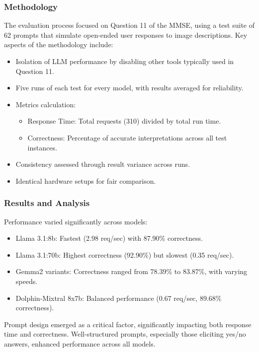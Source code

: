 \subsubsection{Methodology}
The evaluation process focused on Question 11 of the MMSE, using a test suite of 62 prompts that simulate open-ended user responses to image descriptions. Key aspects of the methodology include:

\begin{itemize}
    \item Isolation of LLM performance by disabling other tools typically used in Question 11.
    \item Five runs of each test for every model, with results averaged for reliability.
    \item Metrics calculation: 
        \begin{itemize}
            \item Response Time: Total requests (310) divided by total run time.
            \item Correctness: Percentage of accurate interpretations across all test instances.
        \end{itemize}
    \item Consistency assessed through result variance across runs.
    \item Identical hardware setups for fair comparison.
\end{itemize}

\subsubsection{Results and Analysis}
Performance varied significantly across models:

\begin{itemize}
    \item Llama 3.1:8b: Fastest (2.98 req/sec) with 87.90\% correctness.
    \item Llama 3.1:70b: Highest correctness (92.90\%) but slowest (0.35 req/sec).
    \item Gemma2 variants: Correctness ranged from 78.39\% to 83.87\%, with varying speeds.
    \item Dolphin-Mixtral 8x7b: Balanced performance (0.67 req/sec, 89.68\% correctness).
\end{itemize}

Prompt design emerged as a critical factor, significantly impacting both response time and correctness. Well-structured prompts, especially those eliciting yes/no answers, enhanced performance across all models.

